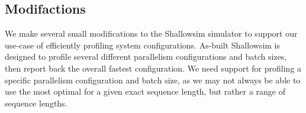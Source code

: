 
%
%
%
%
%

\subsection{Modifactions}

We make several small modifications to the Shallowsim simulator to support our use-case of efficiently profiling system configurations.
As-built Shallowsim is designed to profile several different parallelism configurations and batch sizes, then report back the overall fastest configuration.
We need support for profiling a specific parallelism configuration and batch size, as we may not always be able to use the most optimal for a given exact sequence length, but rather a range of sequence lengths.

